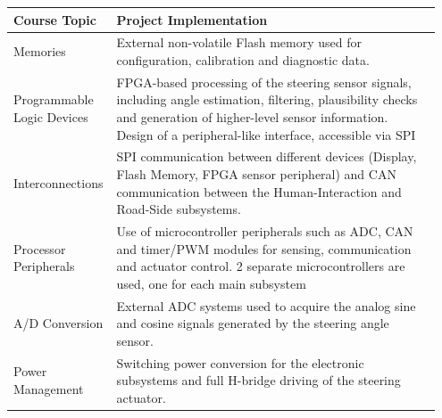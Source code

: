 \begin{table}[H]
	\centering
	\begin{tabular}{p{0.20\linewidth} p{0.75\linewidth}}
		\textbf{Course Topic} & \textbf{Project Implementation} \\ \hline
		Memories & External non-volatile Flash memory used for configuration, calibration and diagnostic data. \\
		
		Programmable Logic Devices & FPGA-based processing of the steering sensor signals, including angle estimation, filtering, plausibility checks and generation of higher-level sensor information. Design of a peripheral-like interface, accessible via SPI\\
		
		Interconnections & SPI communication between different devices (Display, Flash Memory, FPGA sensor peripheral) and CAN communication between the Human-Interaction and Road-Side subsystems. \\
		
		Processor Peripherals & Use of microcontroller peripherals such as ADC, CAN and timer/PWM modules for sensing, communication and actuator control. 2 separate microcontrollers are used, one for each main subsystem\\
		
		A/D Conversion & External ADC systems used to acquire the analog sine and cosine signals generated by the steering angle sensor. \\
		
		Power Management & Switching power conversion for the electronic subsystems and full H-bridge driving of the steering actuator. \\
	\end{tabular}
\end{table}